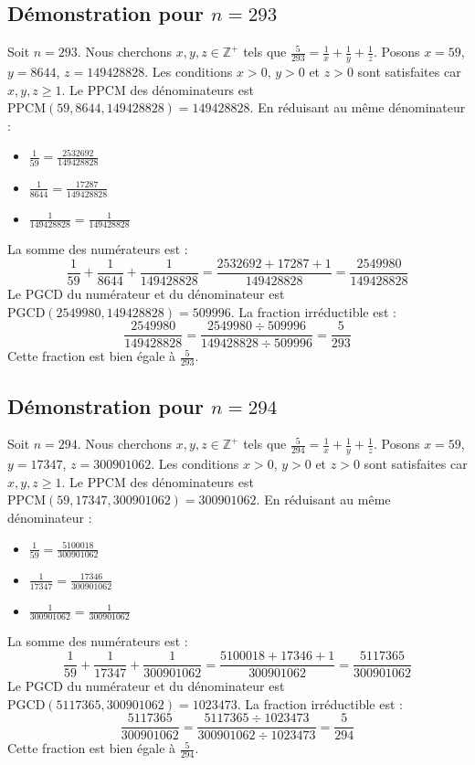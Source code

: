 \documentclass[11pt,a4paper]{article}
\begin{document}
\subsection{Démonstration pour $n = 293$}
Soit $n = 293$. Nous cherchons $x, y, z \in \mathbb{Z}^{+}$ tels que $\frac{5}{293} = \frac{1}{x} + \frac{1}{y} + \frac{1}{z}$.
Posons $x = 59$, $y = 8644$, $z = 149428828$.
Les conditions $x > 0$, $y > 0$ et $z > 0$ sont satisfaites car $x, y, z \geq 1$.
Le PPCM des dénominateurs est $\text{PPCM}(59, 8644, 149428828) = 149428828$.
En réduisant au même dénominateur :
\begin{itemize}
    \item $\frac{1}{59} = \frac{2532692}{149428828}$
    \item $\frac{1}{8644} = \frac{17287}{149428828}$
    \item $\frac{1}{149428828} = \frac{1}{149428828}$
\end{itemize}
La somme des numérateurs est :
$$ \frac{1}{59} + \frac{1}{8644} + \frac{1}{149428828} = \frac{2532692 + 17287 + 1}{149428828} = \frac{2549980}{149428828} $$
Le PGCD du numérateur et du dénominateur est $\text{PGCD}(2549980, 149428828) = 509996$.
La fraction irréductible est :
$$ \frac{2549980}{149428828} = \frac{2549980 \div 509996}{149428828 \div 509996} = \frac{5}{293} $$
Cette fraction est bien égale à $\frac{5}{293}$.

\subsection{Démonstration pour $n = 294$}
Soit $n = 294$. Nous cherchons $x, y, z \in \mathbb{Z}^{+}$ tels que $\frac{5}{294} = \frac{1}{x} + \frac{1}{y} + \frac{1}{z}$.
Posons $x = 59$, $y = 17347$, $z = 300901062$.
Les conditions $x > 0$, $y > 0$ et $z > 0$ sont satisfaites car $x, y, z \geq 1$.
Le PPCM des dénominateurs est $\text{PPCM}(59, 17347, 300901062) = 300901062$.
En réduisant au même dénominateur :
\begin{itemize}
    \item $\frac{1}{59} = \frac{5100018}{300901062}$
    \item $\frac{1}{17347} = \frac{17346}{300901062}$
    \item $\frac{1}{300901062} = \frac{1}{300901062}$
\end{itemize}
La somme des numérateurs est :
$$ \frac{1}{59} + \frac{1}{17347} + \frac{1}{300901062} = \frac{5100018 + 17346 + 1}{300901062} = \frac{5117365}{300901062} $$
Le PGCD du numérateur et du dénominateur est $\text{PGCD}(5117365, 300901062) = 1023473$.
La fraction irréductible est :
$$ \frac{5117365}{300901062} = \frac{5117365 \div 1023473}{300901062 \div 1023473} = \frac{5}{294} $$
Cette fraction est bien égale à $\frac{5}{294}$.
\end{document}
